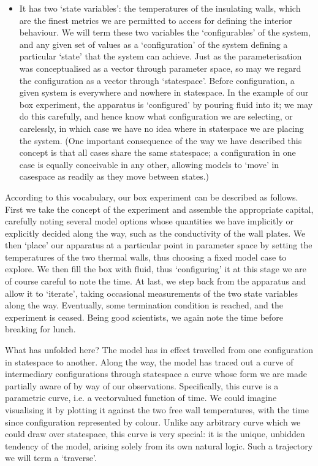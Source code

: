 \documentclass[letterpaper,10pt,english]{jupyterBook}
\begin{document}
\begin{itemize}
\item {} 
\sphinxAtStartPar
It has two ‘state variables’: the temperatures of the insulating walls, which are the finest metrics we are permitted to access for defining the interior behaviour. We will term these two variables the ‘configurables’ of the system, and any given set of values as a ‘configuration’ of the system defining a particular ‘state’ that the system can achieve. Just as the parameterisation was conceptualised as a vector through parameter space, so may we regard the configuration as a vector through ‘state\sphinxhyphen{}space’. Before configuration, a given system is everywhere and nowhere in state\sphinxhyphen{}space. In the example of our box experiment, the apparatus is ‘configured’ by pouring fluid into it; we may do this carefully, and hence know what configuration we are selecting, or carelessly, in which case we have no idea where in state\sphinxhyphen{}space we are placing the system. (One important consequence of the way we have described this concept is that all cases share the same state\sphinxhyphen{}space; a configuration in one case is equally conceivable in any other, allowing models to ‘move’ in case\sphinxhyphen{}space as readily as they move between states.)

\end{itemize}

\sphinxAtStartPar
According to this vocabulary, our box experiment can be described as follows. First we take the concept of the experiment and assemble the appropriate capital, carefully noting several model options whose quantities we have implicitly or explicitly decided along the way, such as the conductivity of the wall plates. We then ‘place’ our apparatus at a particular point in parameter space by setting the temperatures of the two thermal walls, thus choosing a fixed model case to explore. We then fill the box with fluid, thus ‘configuring’ it \sphinxhyphen{} at this stage we are of course careful to note the time. At last, we step back from the apparatus and allow it to ‘iterate’, taking occasional measurements of the two state variables along the way. Eventually, some termination condition is reached, and the experiment is ceased. Being good scientists, we again note the time before breaking for lunch.

\sphinxAtStartPar
What has unfolded here? The model has in effect travelled from one configuration in state\sphinxhyphen{}space to another. Along the way, the model has traced out a curve of intermediary configurations through state\sphinxhyphen{}space \sphinxhyphen{} a curve whose form we are made partially aware of by way of our observations. Specifically, this curve is a parametric curve, i.e. a vector\sphinxhyphen{}valued function of time. We could imagine visualising it by plotting it against the two free wall temperatures, with the time since configuration represented by colour. Unlike any arbitrary curve which we could draw over state\sphinxhyphen{}space, this curve is very special: it is the unique, unbidden tendency of the model, arising solely from its own natural logic. Such a trajectory we will term a ‘traverse’.
\end{document}
